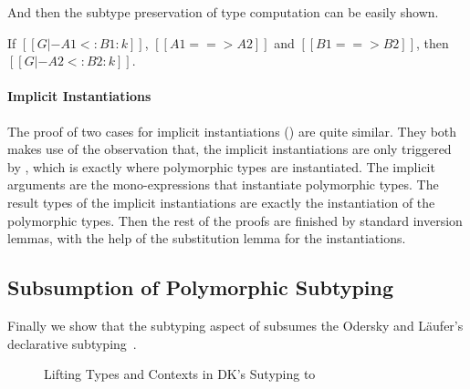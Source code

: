 
And then the subtype preservation of type computation can be easily shown.

\begin{lemma}
    If $[[G |- A1 <: B1 : k]]$, $[[A1 ==> A2]]$ and $[[B1 ==> B2]]$,
    then $[[G |- A2 <: B2 : k]]$.
\end{lemma}


\paragraph{Implicit Instantiations}
The proof of two cases for implicit instantiations ()
are quite similar. They both makes use of the observation that, the implicit
instantiations are only triggered by , which is exactly where
polymorphic types are instantiated. The implicit arguments are the
mono-expressions that instantiate polymorphic types. The result types of the
implicit instantiations are exactly the instantiation of the polymorphic types.
Then the rest of the proofs are finished by standard inversion lemmas,
with the help of the substitution lemma for the instantiations.

\subsection{Subsumption of Polymorphic Subtyping}

Finally we show that the subtyping aspect of \name subsumes the Odersky and L\"aufer's declarative
subtyping~\cite{??}.

\begin{figure}
    \caption{Lifting Types and Contexts in DK's Sutyping to \name}
    \label{fig:lift}
\end{figure}

